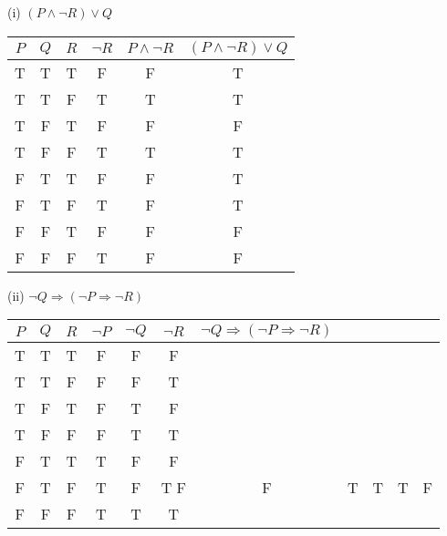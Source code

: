\documentclass{article}
\begin{document}
(i) $(P \land \neg R) \lor Q$\\
\begin{tabular}{|c|c|c|c|c|c|}
    \hline
    $P$ & $Q$ & $R$ & $\neg R$ & $ P \land \neg R$ & $(P \land \neg R) \lor Q$ \\
    \hline
    T   & T   & T   & F        & F                 & T                         \\
    T   & T   & F   & T        & T                 & T                         \\
    T   & F   & T   & F        & F                 & F                         \\
    T   & F   & F   & T        & T                 & T                         \\
    F   & T   & T   & F        & F                 & T                         \\
    F   & T   & F   & T        & F                 & T                         \\
    F   & F   & T   & F        & F                 & F                         \\
    F   & F   & F   & T        & F                 & F                         \\
    \hline
\end{tabular}

(ii) $\neg Q \Rightarrow (\neg P \Rightarrow \neg R)$\\
\begin{tabular}{|c|c|c|c|c|c|c|c|}
    \hline
    $P$ & $Q$ & $R$ & $\neg P $ & $\neg Q$ & $\neg R$ & $\neg Q \Rightarrow (\neg P \Rightarrow \neg R)$ \\
    \hline
    T   & T   & T   & F         & F        & F                                                           \\
    T   & T   & F   & F         & F        & T                                                           \\
    T   & F   & T   & F         & T        & F                                                           \\
    T   & F   & F   & F         & T        & T                                                           \\
    F   & T   & T   & T         & F        & F                                                           \\
    F   & T   & F   & T         & F        & T
    F   & F   & T   & T         & T        & F                                                           \\
    F   & F   & F   & T         & T        & T                                                           \\
    \hline
\end{tabular}
\end{document}
